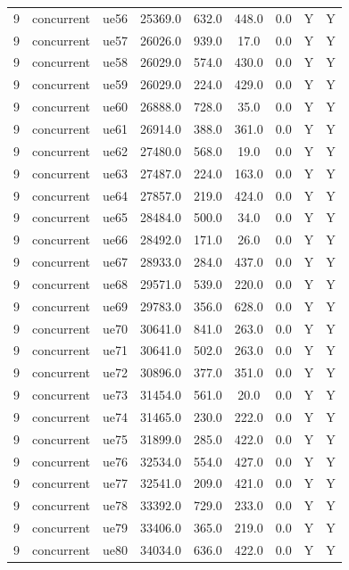 \begin{table}[ht]
\begin{tabular}{|c|c|c|c|c|c|c|c|c|}
9 & concurrent & ue56 & 25369.0 & 632.0 & 448.0 & 0.0 & Y & Y \\
9 & concurrent & ue57 & 26026.0 & 939.0 & 17.0 & 0.0 & Y & Y \\
9 & concurrent & ue58 & 26029.0 & 574.0 & 430.0 & 0.0 & Y & Y \\
9 & concurrent & ue59 & 26029.0 & 224.0 & 429.0 & 0.0 & Y & Y \\
9 & concurrent & ue60 & 26888.0 & 728.0 & 35.0 & 0.0 & Y & Y \\
9 & concurrent & ue61 & 26914.0 & 388.0 & 361.0 & 0.0 & Y & Y \\
9 & concurrent & ue62 & 27480.0 & 568.0 & 19.0 & 0.0 & Y & Y \\
9 & concurrent & ue63 & 27487.0 & 224.0 & 163.0 & 0.0 & Y & Y \\
9 & concurrent & ue64 & 27857.0 & 219.0 & 424.0 & 0.0 & Y & Y \\
9 & concurrent & ue65 & 28484.0 & 500.0 & 34.0 & 0.0 & Y & Y \\
9 & concurrent & ue66 & 28492.0 & 171.0 & 26.0 & 0.0 & Y & Y \\
9 & concurrent & ue67 & 28933.0 & 284.0 & 437.0 & 0.0 & Y & Y \\
9 & concurrent & ue68 & 29571.0 & 539.0 & 220.0 & 0.0 & Y & Y \\
9 & concurrent & ue69 & 29783.0 & 356.0 & 628.0 & 0.0 & Y & Y \\
9 & concurrent & ue70 & 30641.0 & 841.0 & 263.0 & 0.0 & Y & Y \\
9 & concurrent & ue71 & 30641.0 & 502.0 & 263.0 & 0.0 & Y & Y \\
9 & concurrent & ue72 & 30896.0 & 377.0 & 351.0 & 0.0 & Y & Y \\
9 & concurrent & ue73 & 31454.0 & 561.0 & 20.0 & 0.0 & Y & Y \\
9 & concurrent & ue74 & 31465.0 & 230.0 & 222.0 & 0.0 & Y & Y \\
9 & concurrent & ue75 & 31899.0 & 285.0 & 422.0 & 0.0 & Y & Y \\
9 & concurrent & ue76 & 32534.0 & 554.0 & 427.0 & 0.0 & Y & Y \\
9 & concurrent & ue77 & 32541.0 & 209.0 & 421.0 & 0.0 & Y & Y \\
9 & concurrent & ue78 & 33392.0 & 729.0 & 233.0 & 0.0 & Y & Y \\
9 & concurrent & ue79 & 33406.0 & 365.0 & 219.0 & 0.0 & Y & Y \\
9 & concurrent & ue80 & 34034.0 & 636.0 & 422.0 & 0.0 & Y & Y \\

\end{tabular}
\end{table}
